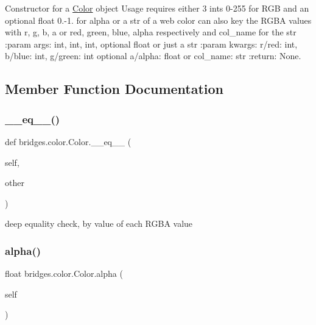 Constructor for a \mbox{\hyperlink{classbridges_1_1color_1_1_color}{Color}} object Usage requires either 3 ints 0-\/255 for R\+GB and an optional float 0.-\/1. for alpha or a str of a web color can also key the R\+G\+BA values with r, g, b, a or red, green, blue, alpha respectively and col\+\_\+name for the str \+:param args\+: int, int, int, optional float or just a str \+:param kwargs\+: r/red\+: int, b/blue\+: int, g/green\+: int optional a/alpha\+: float or col\+\_\+name\+: str \+:return\+: None. 



\subsection{Member Function Documentation}
\mbox{\label{classbridges_1_1color_1_1_color_ae5677a0858252f0b33da13866fb62786}} 
\subsubsection{\texorpdfstring{\_\_eq\_\_()}{\_\_eq\_\_()}}
{\footnotesize\ttfamily def bridges.\+color.\+Color.\+\_\+\+\_\+eq\+\_\+\+\_\+ (\begin{DoxyParamCaption}\item[{}]{self,  }\item[{}]{other }\end{DoxyParamCaption})}



deep equality check, by value of each R\+G\+BA value 

\mbox{\label{classbridges_1_1color_1_1_color_a4cfa0130d36e311f97959d806fcb4415}} 
\subsubsection{\texorpdfstring{alpha()}{alpha()}\hspace{0.1cm}{\footnotesize\ttfamily [1/2]}}
{\footnotesize\ttfamily  float bridges.\+color.\+Color.\+alpha (\begin{DoxyParamCaption}\item[{}]{self }\end{DoxyParamCaption})}



